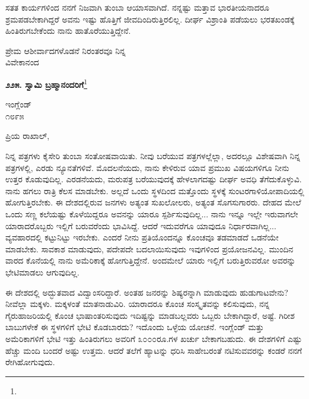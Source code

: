 \eject

ಸತತ ಕಾರ್ಯಗಳಿಂದ ನನಗೆ ನಿಜವಾಗಿ ತುಂಬಾ ಆಯಾಸವಾಗಿದೆ. ನನ್ನಷ್ಟು ಮತ್ತಾವ ಭಾರತೀಯನಾದರೂ ಶ್ರಮಪಡಬೇಕಾಗಿದ್ದರೆ ಅವನು ಇಷ್ಟು ಹೊತ್ತಿಗೆ ಜೀವದಿಂದಿರುತ್ತಿರಲಿಲ್ಲ. ದೀರ್ಘ ವಿಶ್ರಾಂತಿ ಪಡೆಯಲು ಭರತಖಂಡಕ್ಕೆ ಹಿಂತಿರುಗಬೇಕೆಂದು ನಾನು ಹಾತೊರೆಯುತ್ತಿದ್ದೇನೆ.
\vspace{-0.3cm}

{\flushright
ಪ್ರೇಮ ಆಶೀರ್ವಾದಗಳೊಡನೆ ನಿರಂತರವೂ ನಿನ್ನ\\ವಿವೇಕಾನಂದ\par}
\vspace{-0.3cm}

\begin{center}
\textbf{೨೨೫. ಸ್ವಾಮಿ ಬ್ರಹ್ಮಾನಂದರಿಗೆ}\footnote{}
\end{center}
\vspace{-0.5cm}

\begin{flushright}
ಇಂಗ್ಲೆಂಡ್\\೧೮೯೫
\end{flushright}
\vspace{0.1cm}

\noindent
ಪ್ರಿಯ ರಾಖಾಲ್,

ನಿನ್ನ ಪತ್ರಗಳು ಕೈಸೇರಿ ತುಂಬಾ ಸಂತೋಷವಾಯಿತು. ನೀವು ಬರೆಯುವ ಪತ್ರಗಳಲ್ಲೆಲ್ಲಾ, ಅದರಲ್ಲೂ ವಿಶೇಷವಾಗಿ ನಿನ್ನ ಪತ್ರಗಳಲ್ಲಿ, ಎರಡು ನ್ಯೂನತೆಗಳಿವೆ. ಮೊದಲನೆಯದು, ನಾನು ಕೇಳಿರುವ ಯಾವ ಪ್ರಮುಖ ವಿಷಯಗಳಿಗೂ ನೀನು ಉತ್ತರ ಕೊಡುವುದಿಲ್ಲ. ಎರಡನೆಯದು, ಮರುಪತ್ರ ಬರೆಯುವುದಕ್ಕೆ ಹೇಳಲಾಗದಷ್ಟು ದೀರ್ಘ ಅವಧಿ ತೆಗೆದುಕೊಳ್ಳುವಿ. ನಾನು ಹಗಲು ರಾತ್ರಿ ಕೆಲಸ ಮಾಡಬೇಕು. ಅಲ್ಲದೆ ಒಂದು ಸ್ಥಳದಿಂದ ಮತ್ತೊಂದು ಸ್ಥಳಕ್ಕೆ ಸುಂಟರಗಾಳಿಯೋಪಾದಿಯಲ್ಲಿ ಹೋಗುತ್ತಿರಬೇಕು. ಈ ದೇಶದಲ್ಲಿರುವ ಜನಗಳು ಅತ್ಯಂತ ಸುಖಲೋಲರು, ಅತ್ಯಂತ ಸೊಗಸುಗಾರರು. ದೇಹದ ಮೇಲೆ ಒಂದು ಸಣ್ಣ ಕಲೆಯಷ್ಟು ಕೊಳೆಯಿದ್ದರೂ ಅವನನ್ನು ಯಾರೂ ಸ್ಪರ್ಶಿಸುವುದಿಲ್ಲ... ನಾನು ಇನ್ನೂ ಇಲ್ಲೇ ಇರುವಾಗಲೇ ಯಾರಾದರೊಬ್ಬರು ಇಲ್ಲಿಗೆ ಬರುವರೆಂದು ಭಾವಿಸಿದ್ದೆ. ಆದರೆ ಇದುವರೆಗೂ ಯಾವುದೂ ನಿರ್ಧಾರವಾಗಿಲ್ಲ... ವ್ಯವಹಾರದಲ್ಲಿ ಕಟ್ಟುನಿಟ್ಟು ಇರಬೇಕು. ಎಂದರೆ ನೀನು ಪ್ರತಿಯೊಂದನ್ನೂ ಕೊಂಚವೂ ತಡಮಾಡದೆ ಒಡನೆಯೇ ಮಾಡಬೇಕು. ಸಾವಕಾಶ ಮಾಡುವುದು, ಪದೇಪದೇ ಬದಲಾಯಿಸುವುದು ಇವುಗಳಿಂದ ಪ್ರಯೋಜನವಿಲ್ಲ. ಮುಂದಿನ ವಾರದ ಕೊನೆಯಲ್ಲಿ ನಾನು ಅಮೆರಿಕಾಕ್ಕೆ ಹೋಗುತ್ತಿದ್ದೇನೆ. ಅಂದಮೇಲೆ ಯಾರು ಇಲ್ಲಿಗೆ ಬರುತ್ತಿರುವರೋ ಅವರನ್ನು ಭೇಟಿಮಾಡಲು ಆಗುವುದಿಲ್ಲ.

ಈ ದೇಶದಲ್ಲಿ ಅದ್ಭುತವಾದ ವಿದ್ವಾಂಸರಿದ್ದಾರೆ. ಅಂತಹ ಜನರನ್ನು ಶಿಷ್ಯರನ್ನಾಗಿ ಮಾಡುವುದು ಹುಡುಗಾಟವೇನು? ನೀವೆಲ್ಲಾ ಮಕ್ಕಳು. ಮಕ್ಕಳಂತೆ ಮಾತನಾಡುವಿರಿ. ಯಾರಾದರೂ ಕೊಂಚ ಸಂಸ್ಕೃತವನ್ನು ಕಲಿಸುವುದು, ನನ್ನ ಗೈರುಹಾಜರಿಯಲ್ಲಿ ಕೊಂಚ ಭಾಷಾಂತರಿಸುವುದು ಇದಿಷ್ಟನ್ನು ಮಾಡಬಲ್ಲವರು ಒಬ್ಬರು ಬೇಕಾಗಿದ್ದಾರೆ, ಅಷ್ಟೆ. ಗಿರೀಶ ಬಾಬುಗಳೇಕೆ ಈ ಸ್ಥಳಗಳಿಗೆ ಭೇಟಿ ಕೊಡಬಾರದು? ಇದೊಂದು ಒಳ್ಳೆಯ ಯೋಚನೆ. ಇಂಗ್ಲೆಂಡ್ ಮತ್ತು ಅಮೆರಿಕಾಗಳಿಗೆ ಭೇಟಿ ಇತ್ತು ಹಿಂತಿರುಗಲು ಅವರಿಗೆ ೩೦೦೦ರೂ.ಗಳ ಖರ್ಚು ಬೇಕಾಗಬಹುದು. ಈ ದೇಶಗಳಿಗೆ ಎಷ್ಟು ಹೆಚ್ಚು ಮಂದಿ ಬಂದರೆ ಅಷ್ಟು ಉತ್ತಮ. ಆದರೆ ತಲೆಗೆ ಹ್ಯಾಟನ್ನು ಧರಿಸಿ ಸಾಹೇಬರಂತೆ ನಟಿಸುವವರನ್ನು ಕಂಡರೆ ನನಗೆ ರೇಗಿಹೋಗುವುದು.
\vspace{0.2cm}

